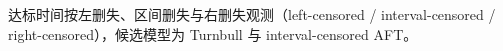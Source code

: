 达标时间按左删失、区间删失与右删失观测（left-censored / interval-censored / right-censored），候选模型为 Turnbull 与 interval-censored AFT。
